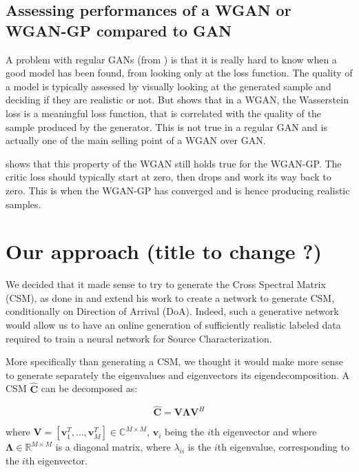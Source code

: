 \documentclass{article}
\begin{document}
\subsection{Assessing performances of a WGAN or WGAN-GP compared to GAN}

A problem with regular GANs (from \cite{goodfellow2020generative}) is that it is really hard to know when a good model has been found, from looking only at the loss function. The quality of a model is typically assessed by visually looking at the generated sample and deciding if they are realistic or not. But \cite{arjovsky2017wasserstein} shows that in a WGAN, the Wasserstein loss is a meaningful loss function, that is correlated with the quality of the sample produced by the generator. This is not true in a regular GAN and is actually one of the main selling point of a WGAN over GAN.

\cite{DBLP:journals/corr/GulrajaniAADC17} shows that this property of the WGAN still holds true for the WGAN-GP. The critic loss should typically start at zero, then drops and work its way back to zero. This is when the WGAN-GP has converged and is hence producing realistic samples.

\section{Our approach (\textbf{title to change ?})}

We decided that it made sense to try to generate the Cross Spectral Matrix (CSM), as done in \cite{gerstoft2020parametric} and extend his work to create a network to generate CSM, conditionally on Direction of Arrival (DoA). Indeed, such a generative network would allow us to have an online generation of sufficiently realistic labeled data required to train a neural network for Source Characterization.

More specifically than generating a CSM, we thought it would make more sense to generate separately the eigenvalues and eigenvectors its eigendecomposition. A CSM $\mathbf{\hat{C}}$ can be decomposed as:

\begin{equation}
    \mathbf{\hat{C}} = \mathbf{V} \mathbf{\Lambda} \mathbf{V}^H
\end{equation}

where $\mathbf{V} = [\mathbf{v}_1^T, \dots, \mathbf{v}_M^T] \in \mathbb{C}^{M \times M}$, $\mathbf{v}_i$ being the $i$th eigenvector and where $\mathbf{\Lambda} \in \mathbb{R}^{M \times M}$ is a diagonal matrix, where $\lambda_{ii}$ is the $i$th eigenvalue, corresponding to the $i$th eigenvector.
\end{document}
